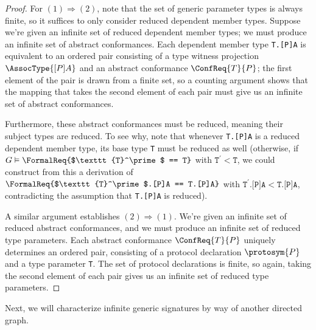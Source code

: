 \documentclass[../generics]{subfiles}
\begin{document}
\begin{proof}
For $(1)\Rightarrow(2)$, note that the set of generic parameter types is always finite, so it suffices to only consider reduced dependent member types. Suppose we're given an infinite set of reduced dependent member types; we must produce an infinite set of abstract conformances. Each dependent member type \texttt{T.[P]A} is equivalent to an ordered pair consisting of a type witness projection $\AssocType{[P]A}$ and an abstract conformance $\ConfReq{T}{P}$; the first element of the pair is drawn from a finite set, so a counting argument shows that the mapping that takes the second element of each pair must give us an infinite set of abstract conformances.

Furthermore, these abstract conformances must be reduced, meaning their subject types are reduced. To see why, note that whenever \texttt{T.[P]A} is a reduced dependent member type, its base type \texttt{T} must be reduced as well (otherwise, if $G\vDash\FormalReq{$\texttt{T}^\prime$ == T}$ with $\texttt{T}^\prime<\texttt{T}$, we could construct from this a derivation of $\FormalReq{$\texttt{T}^\prime$.[P]A == T.[P]A}$ with $\texttt{$\texttt{T}^\prime$.[P]A} < \texttt{T.[P]A}$, contradicting the assumption that \texttt{T.[P]A} is reduced).

A similar argument establishes $(2)\Rightarrow(1)$. We're given an infinite set of reduced abstract conformances, and we must produce an infinite set of reduced type parameters. Each abstract conformance $\ConfReq{T}{P}$ uniquely determines an ordered pair, consisting of a protocol declaration $\protosym{P}$ and a type parameter \texttt{T}. The set of protocol declarations is finite, so again, taking the second element of each pair gives us an infinite set of reduced type parameters.
\end{proof}

Next, we will characterize infinite generic signatures by way of another directed graph.
\end{document}
